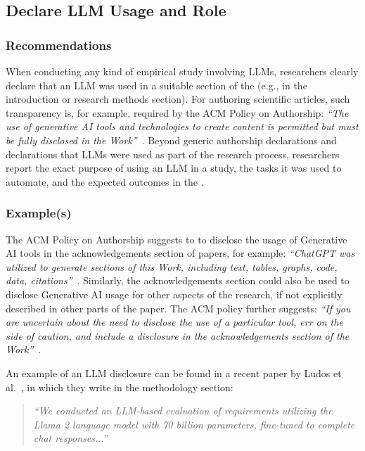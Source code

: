 



\subsection{Declare LLM Usage and Role}

\subsubsection{Recommendations}

When conducting any kind of empirical study involving LLMs, researchers \must clearly declare that an LLM was used in a suitable section of the \paper (e.g., in the introduction or research methods section).
For authoring scientific articles, such transparency is, for example, required by the ACM Policy on Authorship: \emph{``The use of generative AI tools and technologies to create content is permitted but must be fully disclosed in the Work''}~\cite{ACM2023}.
Beyond generic authorship declarations and declarations that LLMs were used as part of the research process, researchers \should report the exact purpose of using an LLM in a study, the tasks it was used to automate, and the expected outcomes in the \paper.


\subsubsection{Example(s)}

The ACM Policy on Authorship suggests to to disclose the usage of Generative AI tools in the acknowledgements section of papers, for example: \emph{``ChatGPT was utilized to generate sections of this Work, including text, tables, graphs, code, data, citations''}~\cite{ACM2023}. 
Similarly, the acknowledgements section could also be used to disclose Generative AI usage for other aspects of the research, if not explicitly described in other parts of the paper.
The ACM policy further suggests: \emph{``If you are uncertain ­about the need to disclose the use of a particular tool, err on the side of caution, and include a disclosure in the acknowledgements section of the Work''}~\cite{ACM2023}.

An example of an LLM disclosure can be found in a recent paper by Ludos et al.~\cite{DBLP:conf/re/LubosFTGMEL24}, in which they write in the methodology section:

\begin{quote}
\it
``We conducted an LLM-based evaluation of requirements utilizing the Llama 2 language model with 70 billion parameters, fine-tuned to complete chat responses...''
\end{quote}


